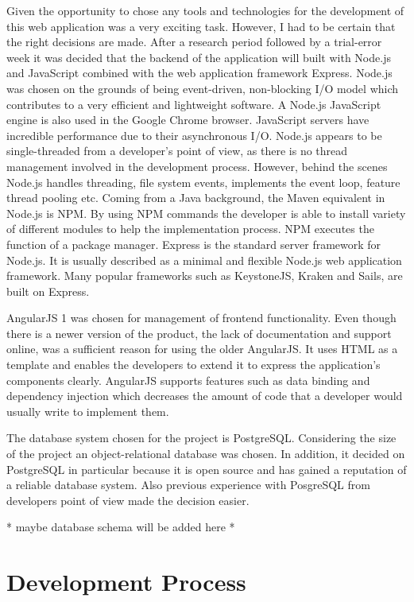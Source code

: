 \documentclass{l4proj}
\begin{document}
Given the opportunity to chose any tools and technologies for the development of this web application was a very exciting task. However, I had to be certain that the right decisions are made. After a research period followed by a trial-error week it was decided that the backend of the application will built with Node.js and JavaScript combined with the web application framework Express. Node.js was chosen on the grounds of being event-driven, non-blocking I/O model which contributes to a very efficient and lightweight software. A Node.js JavaScript engine is also used in the Google Chrome browser. JavaScript servers have incredible performance due to their asynchronous I/O. Node.js appears to be single-threaded from a developer's point of view, as there is no thread management involved in the development process. However, behind the scenes Node.js handles threading, file system events, implements the event loop, feature thread pooling etc. Coming from a Java background, the Maven equivalent in Node.js is NPM. By using NPM commands the developer is able to install variety of different modules to help the implementation process. NPM executes the function of a package manager. Express is the standard server framework for Node.js. It is usually described as a minimal and flexible Node.js web application framework. Many popular frameworks such as KeystoneJS, Kraken and Sails, are built on Express. 

AngularJS 1 was chosen for management of frontend functionality. Even though there is a newer version of the product, the lack of documentation and support online, was a sufficient reason for using the older AngularJS. It uses HTML as a template and enables the developers to extend it to express the application's components clearly. AngularJS supports features such as data binding and dependency injection which decreases the amount of code that a developer would usually write to implement them. 

The database system chosen for the project is PostgreSQL. Considering the size of the project an object-relational database was chosen. In addition, it decided on PostgreSQL in particular because it is open source and has gained a reputation of a reliable database system. Also previous experience with PosgreSQL from developers point of view made the decision easier.

* maybe database schema will be added here *  

\section{Development Process}
\end{document}
